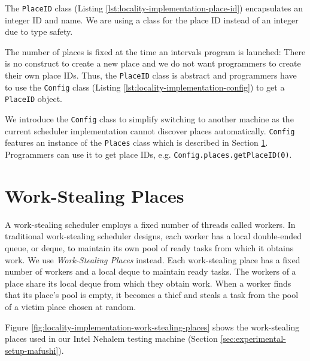 The \lstinline!PlaceID! class (Listing
\ref{lst:locality-implementation-place-id}) encapsulates an integer ID
and name. We are using a class for the place ID instead of an integer
due to type safety. 

The number of places is fixed at the time an intervals program is
launched: There is no construct to create a new place and we do not
want programmers to create their own place IDs. Thus, the
\lstinline!PlaceID!  class is abstract and programmers have to use the
\lstinline!Config! class (Listing
\ref{lst:locality-implementation-config}) to get a \lstinline!PlaceID!
object.



We introduce the \lstinline!Config! class to simplify switching to
another machine as the current scheduler implementation cannot
discover places automatically. \lstinline!Config! features an instance
of the \lstinline!Places! class which is described in Section
\ref{sec:locality-implementation-work-stealing-places}. Programmers
can use it to get place IDs,
e.g. \lstinline!Config.places.getPlaceID(0)!.




\section{Work-Stealing Places}
\label{sec:locality-implementation-work-stealing-places}

A work-stealing scheduler employs a fixed number of threads called
workers. In traditional work-stealing scheduler designs, each worker
has a local double-ended queue, or deque, to maintain its own pool of
ready tasks from which it obtains work. We use \emph{Work-Stealing
  Places} instead. Each work-stealing place has a fixed number of
workers and a local deque to maintain ready tasks. The workers of a
place share its local deque from which they obtain work. When a worker
finds that its place's pool is empty, it becomes a thief and steals a
task from the pool of a victim place chosen at random.

Figure \ref{fig:locality-implementation-work-stealing-places} shows
the work-stealing places used in our Intel Nehalem testing machine
(Section \ref{sec:experimental-setup-mafushi}).

